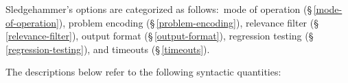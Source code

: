 \documentclass[a4paper,12pt]{article}
\let\oldS=\S
\def\S{\oldS\,}
\def\qtybf#1{$\mathbf{\left<\textbf{\textit{#1\/}}\right>}$}
\renewcommand\_{\hbox{\textunderscore\kern-.05ex}}
\begin{document}
\def\defl{\{}
\def\defr{\}}

\def\flushitem#1{\item[]\noindent\kern-\leftmargin \textbf{#1}}
\def\optrueonly#1{\flushitem{\textit{#1} $\bigl[$= \textit{true}$\bigr]$\enskip}\nopagebreak\\[\parskip]}
\def\optrue#1#2{\flushitem{\textit{#1} $\bigl[$= \qtybf{bool}$\bigr]$\enskip \defl\textit{true}\defr\hfill (neg.: \textit{#2})}\nopagebreak\\[\parskip]}
\def\opfalse#1#2{\flushitem{\textit{#1} $\bigl[$= \qtybf{bool}$\bigr]$\enskip \defl\textit{false}\defr\hfill (neg.: \textit{#2})}\nopagebreak\\[\parskip]}
\def\opsmart#1#2{\flushitem{\textit{#1} $\bigl[$= \qtybf{smart\_bool}$\bigr]$\enskip \defl\textit{smart}\defr\hfill (neg.: \textit{#2})}\nopagebreak\\[\parskip]}
\def\opsmartx#1#2{\flushitem{\textit{#1} $\bigl[$= \qtybf{smart\_bool}$\bigr]$\enskip \defl\textit{smart}\defr\\\hbox{}\hfill (neg.: \textit{#2})}\nopagebreak\\[\parskip]}
\def\opnodefault#1#2{\flushitem{\textit{#1} = \qtybf{#2}} \nopagebreak\\[\parskip]}
\def\opnodefaultbrk#1#2{\flushitem{$\bigl[$\textit{#1} =$\bigr]$ \qtybf{#2}} \nopagebreak\\[\parskip]}
\def\opdefault#1#2#3{\flushitem{\textit{#1} = \qtybf{#2}\enskip \defl\textit{#3}\defr} \nopagebreak\\[\parskip]}
\def\oparg#1#2#3{\flushitem{\textit{#1} \qtybf{#2} = \qtybf{#3}} \nopagebreak\\[\parskip]}
\def\opargbool#1#2#3{\flushitem{\textit{#1} \qtybf{#2} $\bigl[$= \qtybf{bool}$\bigr]$\hfill (neg.: \textit{#3})}\nopagebreak\\[\parskip]}
\def\opargboolorsmart#1#2#3{\flushitem{\textit{#1} \qtybf{#2} $\bigl[$= \qtybf{smart\_bool}$\bigr]$\hfill (neg.: \textit{#3})}\nopagebreak\\[\parskip]}

Sledgehammer's options are categorized as follows:\ mode of operation
(\S\ref{mode-of-operation}), problem encoding (\S\ref{problem-encoding}),
relevance filter (\S\ref{relevance-filter}), output format
(\S\ref{output-format}), regression testing (\S\ref{regression-testing}),
and timeouts (\S\ref{timeouts}).

The descriptions below refer to the following syntactic quantities:
\end{document}
